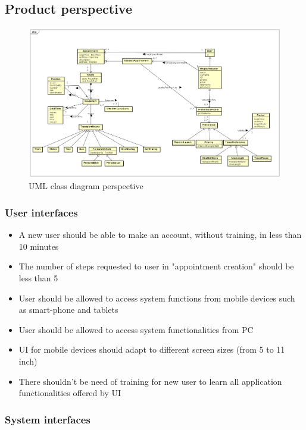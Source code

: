 

\subsection{Product perspective}

\begin{figure}
	\centering
	\includegraphics[width=\textwidth]{Images/Class_Diagram.png}
	\caption{\label{fig:classDiagram} UML class diagram perspective }
\end{figure}


\subsubsection{User interfaces}

\begin{itemize}
	\item A new user should be able to make an account, without training, in less than 10 minutes
	\item The number of steps requested to user in "appointment creation" should be less than 5
	\item User should be allowed to access system functions from mobile devices such as smart-phone and tablets
	\item User should be allowed to access system functionalities from PC
	\item UI for mobile devices should adapt to different screen sizes (from 5 to 11 inch)
	\item There shouldn't be need of training for new user to learn all application functionalities offered by UI
\end{itemize}
\subsubsection{System interfaces}

